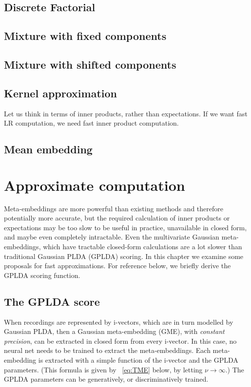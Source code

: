 \documentclass[a4paper,oneside,12pt,english]{report}
\begin{document}
 


\section{Discrete Factorial}

\section{Mixture with fixed components}

\section{Mixture with shifted components}


\section{Kernel approximation}
Let us think in terms of inner products, rather than expectations. If we want fast LR computation, we need fast inner product computation. 



\section{Mean embedding}


\chapter{Approximate computation}
Meta-embeddings are more powerful than existing methods and therefore potentially more accurate, but the required calculation of inner products or expectations may be too slow to be useful in practice, unavailable in closed form, and maybe even completely intractable. Even the multivariate Gaussian meta-embeddings, which have tractable closed-form calculations are a lot slower than traditional Gaussian PLDA (GPLDA) scoring. In this chapter we examine some proposals for fast approximations. For reference below, we briefly derive the GPLDA scoring function.


\section{The GPLDA score}
When recordings are represented by i-vectors, which are in turn modelled by Gaussian PLDA, then a Gaussian meta-embedding (GME), with \emph{constant precision}, can be extracted in closed form from every i-vector. In this case, no neural net needs to be trained to extract the meta-embeddings. Each meta-embedding is extracted with a simple function of the i-vector and the GPLDA parameters. (This formula is given by ~\eqref{eq:TME} below, by letting $\nu\to\infty$.) The GPLDA parameters can be generatively, or discriminatively trained. 
\end{document}
